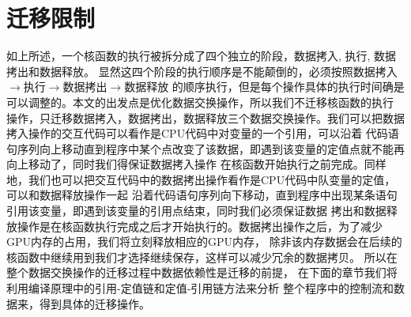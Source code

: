 \section{迁移限制}
如上所述，一个核函数的执行被拆分成了四个独立的阶段，数据拷入, 执行, 数据拷出和数据释放。
显然这四个阶段的执行顺序是不能颠倒的，必须按照数据拷入$\rightarrow$执行$\rightarrow$数据拷出$\rightarrow$数据释放
的顺序执行，但是每个操作具体的执行时间确是可以调整的。本文的出发点是优化数据交换操作，所以我们不迁移核函数的执行
操作，只迁移数据拷入，数据拷出，数据释放三个数据交换操作。我们可以把数据拷入操作的交互代码可以看作是CPU代码中对变量的一个引用，可以沿着
代码语句序列向上移动直到程序中某个点改变了该数据，即遇到该变量的定值点就不能再向上移动了，同时我们得保证数据拷入操作
在核函数开始执行之前完成。同样地，我们也可以把交互代码中的数据拷出操作看作是CPU代码中队变量的定值，可以和数据释放操作一起
沿着代码语句序列向下移动，直到程序中出现某条语句引用该变量，即遇到该变量的引用点结束，同时我们必须保证数据
拷出和数据释放操作是在核函数执行完成之后才开始执行的。数据拷出操作之后，为了减少GPU内存的占用，我们将立刻释放相应的GPU内存，
除非该内存数据会在后续的核函数中继续用到我们才选择继续保存，这样可以减少冗余的数据拷贝。
所以在整个数据交换操作的迁移过程中数据依赖性是迁移的前提，
在下面的章节我们将利用编译原理中的引用-定值链和定值-引用链方法来分析
整个程序中的控制流和数据来，得到具体的迁移操作。
